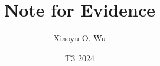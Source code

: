 \documentclass[a4paper,12pt]{article}
\title{Note for Evidence}
\author[1]{Xiaoyu O. Wu}
\affil{Griffith University}
\date{T3 2024}
\begin{document}
\onehalfspacing
\maketitle


%




%

%

%


%
%
\end{document}
